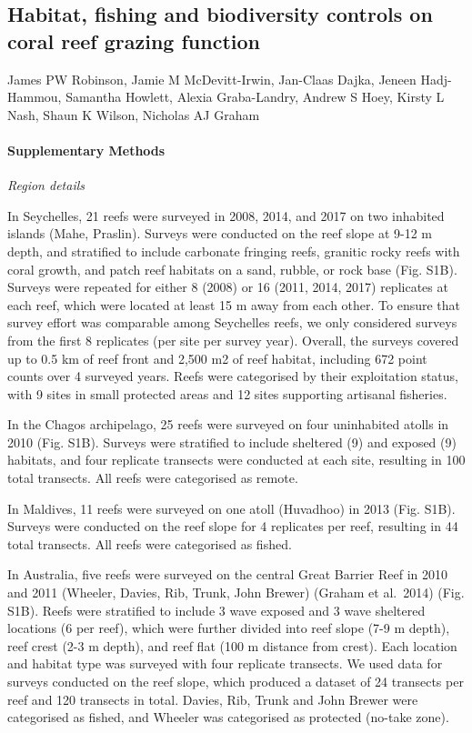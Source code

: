 \documentclass[12pt,]{article}
\title{}
\author{}
\date{}
\let\oldparagraph\paragraph
\renewcommand{\paragraph}[1]{\oldparagraph{#1}\mbox{}}
\begin{document}
\hypertarget{habitat-fishing-and-biodiversity-controls-on-coral-reef-grazing-function}{%
\subsection{Habitat, fishing and biodiversity controls on coral reef
grazing
function}\label{habitat-fishing-and-biodiversity-controls-on-coral-reef-grazing-function}}

James PW Robinson, Jamie M McDevitt-Irwin, Jan-Claas Dajka, Jeneen
Hadj-Hammou, Samantha Howlett, Alexia Graba-Landry, Andrew S Hoey,
Kirsty L Nash, Shaun K Wilson, Nicholas AJ Graham

\hypertarget{supplementary-methods}{%
\paragraph{Supplementary Methods}\label{supplementary-methods}}

\emph{Region details}

In Seychelles, 21 reefs were surveyed in 2008, 2014, and 2017 on two
inhabited islands (Mahe, Praslin). Surveys were conducted on the reef
slope at 9-12 m depth, and stratified to include carbonate fringing
reefs, granitic rocky reefs with coral growth, and patch reef habitats
on a sand, rubble, or rock base (Fig. S1B). Surveys were repeated for
either 8 (2008) or 16 (2011, 2014, 2017) replicates at each reef, which
were located at least 15 m away from each other. To ensure that survey
effort was comparable among Seychelles reefs, we only considered surveys
from the first 8 replicates (per site per survey year). Overall, the
surveys covered up to 0.5 km of reef front and 2,500 m2 of reef habitat,
including 672 point counts over 4 surveyed years. Reefs were categorised
by their exploitation status, with 9 sites in small protected areas and
12 sites supporting artisanal fisheries.

In the Chagos archipelago, 25 reefs were surveyed on four uninhabited
atolls in 2010 (Fig. S1B). Surveys were stratified to include sheltered
(9) and exposed (9) habitats, and four replicate transects were
conducted at each site, resulting in 100 total transects. All reefs were
categorised as remote.

In Maldives, 11 reefs were surveyed on one atoll (Huvadhoo) in 2013
(Fig. S1B). Surveys were conducted on the reef slope for 4 replicates
per reef, resulting in 44 total transects. All reefs were categorised as
fished.

In Australia, five reefs were surveyed on the central Great Barrier Reef
in 2010 and 2011 (Wheeler, Davies, Rib, Trunk, John Brewer) (Graham et
al.~2014) (Fig. S1B). Reefs were stratified to include 3 wave exposed
and 3 wave sheltered locations (6 per reef), which were further divided
into reef slope (7-9 m depth), reef crest (2-3 m depth), and reef flat
(100 m distance from crest). Each location and habitat type was surveyed
with four replicate transects. We used data for surveys conducted on the
reef slope, which produced a dataset of 24 transects per reef and 120
transects in total. Davies, Rib, Trunk and John Brewer were categorised
as fished, and Wheeler was categorised as protected (no-take zone).
\end{document}
